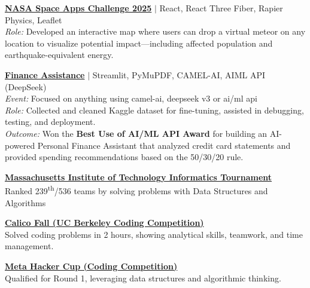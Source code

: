 \documentclass[a4paper,12pt]{article}
\begin{document}
\vspace{0.5em}


\textbf{\href{https://www.linkedin.com/feed/update/urn:li:activity:7380616340077690880/}{NASA Space Apps Challenge 2025}} 
$|$ React, React Three Fiber, Rapier Physics, Leaflet \\
\textit{Role:} Developed an interactive map where users can drop a virtual meteor on any location to visualize potential impact—including affected population and earthquake-equivalent energy.


\vspace{0.5em}

\textbf{\href{https://lablab.ai/event/fall-in-love-with-deepseek/shallowseekers/ai-powered-personal-finance-assistant}{Finance Assistance}} 
$|$ Streamlit, PyMuPDF, CAMEL-AI, AIML API (DeepSeek) \\
\textit{Event:} Focused on anything using camel-ai, deepseek v3 or ai/ml api \\
\textit{Role:} Collected and cleaned Kaggle dataset for fine-tuning, assisted in debugging, testing, and deployment. \\
\textit{Outcome:} Won the \textbf{Best Use of AI/ML API Award} for building an AI-powered Personal Finance Assistant that analyzed credit card statements and provided spending recommendations based on the 50/30/20 rule.

\vspace{0.5em}


\textbf{\href{https://www.linkedin.com/posts/muhammad-qasim-gill_mit2winter2025-teamicodegurupro-problemsolving-activity-7287252831252680704-BMRf?utm_source=share&utm_medium=member_desktop&rcm=ACoAACG6gOwBnlfoWP0KSUXYMZV0hE4WXwmWsBQ}{Massachusetts Institute of Technology Informatics Tournament}} \\
Ranked 239\textsuperscript{th}/536 teams by solving problems with Data Structures and Algorithms


\vspace{0.5em}


\textbf{\href{https://drive.google.com/file/d/1m7mCVE9o4MydZOjpE6-6a_idNBluioeA/view?usp=drive_link}{Calico Fall (UC Berkeley Coding Competition)}} \\
Solved coding problems in 2 hours, showing analytical skills, teamwork, and time management.

\vspace{0.5em}

\textbf{\href{https://drive.google.com/file/d/1HeAbr-IcT9DLcyxMDckvL4oIVeadHqbU/view}{Meta Hacker Cup (Coding Competition)}} \\
Qualified for Round 1, leveraging data structures and algorithmic thinking.
\end{document}
